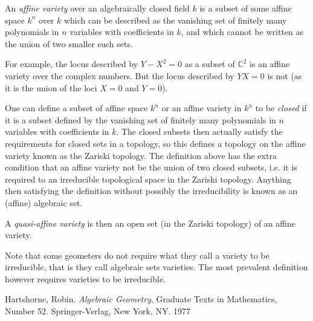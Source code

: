 \documentclass{article}
\begin{document}
An {\em affine variety} over an algebraically closed field $k$ is a subset of some affine space $k^n$ over $k$ which can be described as the vanishing set of finitely many polynomials in $n$ variables with coefficients in $k$, and which cannot be written as the union of two smaller such sets.

For example, the locus described by $Y - X^2 = 0$ as a subset of $\mathbb{C}^2$ is an affine variety over the complex numbers.  But the locus described by $YX = 0$ is not (as it is the union of the loci $X = 0$ and $Y = 0$).

One can define a subset of affine space $k^n$ or an affine variety in $k^n$ to be \emph{closed} if it is a subset defined by the vanishing set of finitely many polynomials in $n$ variables with coefficients in $k$.  The closed subsets then actually satisfy the requirements for closed sets in a topology, so this defines a topology on the affine variety known as the Zariski topology.  The definition above has the  extra condition that an affine variety not be the union of two closed subsets, i.e. it is required to an irreducible topological space in the Zariski topology.  Anything then satisfying the definition without possibly the irreducibility is known as an (affine) algebraic set.

A {\em quasi-affine variety} is then an open set (in the Zariski topology) of an affine variety.

Note that some geometers do not require what they call a variety to be irreducible, that is they call algebraic sets varieties.  The most prevalent definition however requires varieties to be irreducible.


\begin{thebibliography}{9}
 Hartshorne, Robin.  \emph{Algebraic Geometry}, Graduate Texts in Mathematics, Number 52.  Springer-Verlag, New York, NY.  1977
\end{thebibliography}
\end{document}
